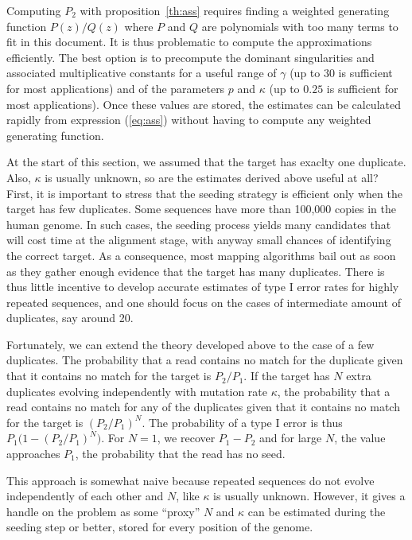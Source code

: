\documentclass{article}
\begin{document}
Computing $P_2$ with proposition~\ref{th:ass} requires finding a weighted
generating function $P(z)/Q(z)$ where $P$ and $Q$ are polynomials with too
many terms to fit in this document. It is thus problematic to compute the
approximations efficiently. The best option is to precompute the dominant
singularities and associated multiplicative constants for a useful range
of $\gamma$ (up to $30$ is sufficient for most applications) and of the
parameters $p$ and $\kappa$ (up to $0.25$ is sufficient for most
applications). Once these values are stored, the estimates can be
calculated rapidly from expression (\ref{eq:ass}) without having to
compute any weighted generating function.

At the start of this section, we assumed that the target has exaclty one
duplicate. Also, $\kappa$ is usually unknown, so are the estimates derived
above useful at all? First, it is important to stress that the seeding
strategy is efficient only when the target has few duplicates. Some
sequences have more than 100,000 copies in the human genome. In such
cases, the seeding process yields many candidates that will cost time at
the alignment stage, with anyway small chances of identifying the correct
target. As a consequence, most mapping algorithms bail out as soon as they
gather enough evidence that the target has many duplicates. There is thus
little incentive to develop accurate estimates of type I error rates for
highly repeated sequences, and one should focus on the cases of
intermediate amount of duplicates, say around 20.

Fortunately, we can extend the theory developed above to the case of a few
duplicates. The probability that a read contains no match for the
duplicate given that it contains no match for the target is $P_2 / P_1$.
If the target has $N$ extra duplicates evolving independently with
mutation rate $\kappa$, the probability that a read contains no match for
any of the duplicates given that it contains no match for the target is
$(P_2 / P_1)^N$. The probability of a type I error is thus $P_1\big(1-(P_2
/ P_1)^N\big)$. For $N=1$, we recover $P_1-P_2$ and for large $N$, the
value approaches $P_1$, the probability that the read has no seed.

This approach is somewhat naive because repeated sequences do not evolve
independently of each other and $N$, like $\kappa$ is usually unknown.
However, it gives a handle on the problem as some ``proxy'' $N$ and
$\kappa$ can be estimated during the seeding step or better, stored for
every position of the genome.
\end{document}
